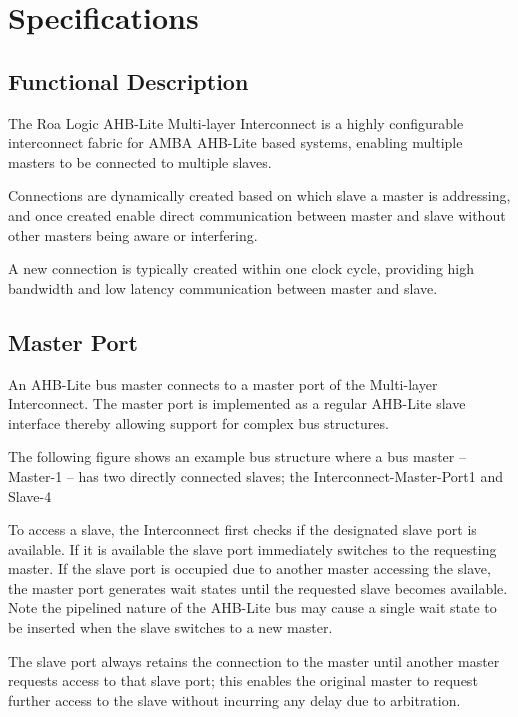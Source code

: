 \chapter{Specifications}\label{specifications}

\section{Functional Description}\label{functional-description}

The Roa Logic AHB-Lite Multi-layer Interconnect is a highly configurable
interconnect fabric for AMBA AHB-Lite based systems, enabling multiple
masters to be connected to multiple slaves.

Connections are dynamically created based on which slave a master is
addressing, and once created enable direct communication between master
and slave without other masters being aware or interfering.

A new connection is typically created within one clock cycle, providing
high bandwidth and low latency communication between master and slave.

\section{Master Port}\label{master-port}

An AHB-Lite bus master connects to a master port of the Multi-layer
Interconnect. The master port is implemented as a regular AHB-Lite slave
interface thereby allowing support for complex bus structures.

The following figure shows an example bus structure where a bus master -- Master-1
-- has two directly connected slaves; the Interconnect-Master-Port1 and
Slave-4

To access a slave, the Interconnect first checks if the designated slave
port is available. If it is available the slave port immediately
switches to the requesting master. If the slave port is occupied due to
another master accessing the slave, the master port generates wait
states until the requested slave becomes available. Note the pipelined
nature of the AHB-Lite bus may cause a single wait state to be inserted
when the slave switches to a new master.

The slave port always retains the connection to the master until another
master requests access to that slave port; this enables the original
master to request further access to the slave without incurring any
delay due to arbitration.

